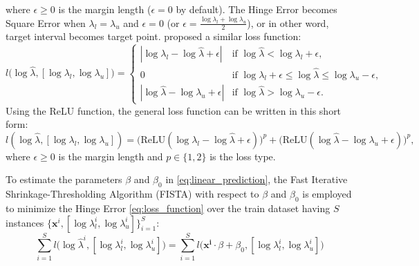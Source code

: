 \documentclass[12pt]{article}
\begin{document}
\noindent where $\epsilon \geq 0$ is the margin length ($\epsilon=0$ by default).
The Hinge Error becomes Square Error when $\lambda_l = \lambda_u$ and $\epsilon = 0$ (or $\epsilon = \frac{\log\lambda_l+\log\lambda_u}{2}$), or in other word, target interval becomes target point.
\citet{mmit} proposed a similar loss function:
$$l\Big(\log \hat{\lambda}, [\log \lambda_l, \log \lambda_u]\Big) = 
\begin{cases} 
    |\log \lambda_l - \log \hat{\lambda} + \epsilon| & \mbox{if } \log \hat{\lambda} < \log \lambda_l + \epsilon, \\
    0 & \mbox{if } \log \lambda_l + \epsilon \leq \log \hat{\lambda} \leq \log \lambda_u - \epsilon, \\
    |\log \hat{\lambda} - \log \lambda_u + \epsilon| & \mbox{if } \log \hat{\lambda} > \log \lambda_u - \epsilon.
\end{cases}$$
Using the ReLU function, the general loss function can be written in this short form:
\begin{equation} \label{eq:loss_function}
    l(\log \hat{\lambda}, [\log \lambda_l, \log \lambda_u]) = \Big( \text{ReLU}(\log \lambda_l - \log \hat{\lambda} + \epsilon)\Big)^p + \Big(\text{ReLU}(\log \hat{\lambda} - \log \lambda_u + \epsilon) \Big)^p,
\end{equation}where $\epsilon \geq 0$ is the margin length and $p \in \{1, 2\}$ is the loss type.

To estimate the parameters $\beta$ and $\beta_0$ in \eqref{eq:linear_prediction}, the Fast Iterative Shrinkage-Thresholding Algorithm (FISTA) \citep{fista} with respect to $\beta$ and $\beta_0$ is employed to minimize the Hinge Error \eqref{eq:loss_function} over the train dataset having $S$ instances $\{\mathbf{x}^i, [\log \lambda_l^i, \log \lambda_u^i]\}_{i=1}^S$:
\begin{equation*}
    \sum_{i = 1}^S l\Big(\log \hat{\lambda}^i, [\log \lambda_l^i, \log \lambda_u^i]\Big) = \sum_{i = 1}^S l\Big(\mathbf{x^i} \cdot \beta + \beta_0, [\log \lambda_l^i, \log \lambda_u^i]\Big)
\end{equation*}
\end{document}
